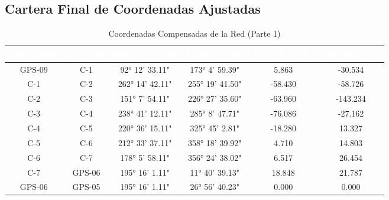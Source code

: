 \documentclass[11pt,letterpaper]{article}
\begin{document}
\subsection{Cartera Final de Coordenadas Ajustadas}
\begin{table}[H]
  \centering
  \small
  \caption{Coordenadas Compensadas de la Red (Parte 1)}
  \label{tab:ajuste_0}
  \begin{tabular}{|c|c|c|c|c|c|}
    \hline
    \rowcolor{GeoBlue}
    \textcolor{white}{\textbf{Estacionado}} & \textcolor{white}{\textbf{Pto\_Obs}} & \textcolor{white}{\textbf{Ang\_Hz\_Ajus}} & \textcolor{white}{\textbf{Azimut\_Línea}} & \textcolor{white}{\textbf{Dep\_Ajus (E)}} & \textcolor{white}{\textbf{Lat\_Ajus (N)}} \\
    \hline
    \rowcolor{GeoBlue!5}
    GPS-09 & C-1 & 92° 12' 33.11" & 173° 4' 59.39" & 5.863 & -30.534 \\
    \hline
    \rowcolor{white}
    C-1 & C-2 & 262° 14' 42.11" & 255° 19' 41.50" & -58.430 & -58.726 \\
    \hline
    \rowcolor{GeoBlue!5}
    C-2 & C-3 & 151° 7' 54.11" & 226° 27' 35.60" & -63.960 & -143.234 \\
    \hline
    \rowcolor{white}
    C-3 & C-4 & 238° 41' 12.11" & 285° 8' 47.71" & -76.086 & -27.162 \\
    \hline
    \rowcolor{GeoBlue!5}
    C-4 & C-5 & 220° 36' 15.11" & 325° 45' 2.81" & -18.280 & 13.327 \\
    \hline
    \rowcolor{white}
    C-5 & C-6 & 212° 33' 37.11" & 358° 18' 39.92" & 4.710 & 14.803 \\
    \hline
    \rowcolor{GeoBlue!5}
    C-6 & C-7 & 178° 5' 58.11" & 356° 24' 38.02" & 6.517 & 26.454 \\
    \hline
    \rowcolor{white}
    C-7 & GPS-06 & 195° 16' 1.11" & 11° 40' 39.13" & 18.848 & 21.787 \\
    \hline
    \rowcolor{GeoBlue!5}
    GPS-06 & GPS-05 & 195° 16' 1.11" & 26° 56' 40.23" & 0.000 & 0.000 \\
    \hline
  \end{tabular}
\end{table}
\vspace{0.8cm}
\end{document}
